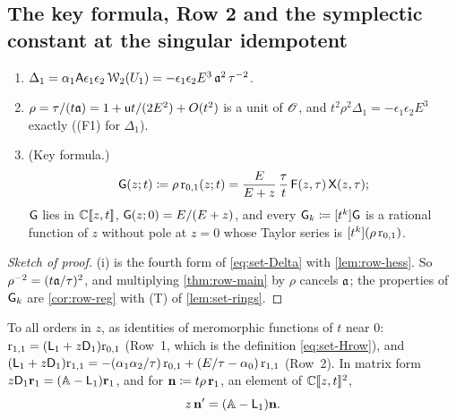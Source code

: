 \subsection{The key formula, Row 2 and the symplectic constant at the singular idempotent}
\label{sec:lea-qde}

\begin{prop}
\label{prop:lea-key}
\leavevmode
\begin{enumerate}
\item $\Delta_1=\alpha_1\mathsf{A}\epsilon_1\epsilon_2\,\mathcal{W}_2(U_1)=-\epsilon_1\epsilon_2E^3\,\mathfrak{a}^2\,\tau^{-2}$.
\item $\rho=\tau/(t\mathfrak{a})=1+\mathsf{u} t/(2E^2)+O(t^2)$ is a unit of $\mathscr{O}$, and $t^2\rho^2\Delta_1=-\epsilon_1\epsilon_2E^3$ exactly ((F1) for $\Delta_1$).
\item (Key formula.)
\begin{equation}
\label{eq:lea-key}
\mathsf{G}(z;t)\coloneqq\rho\,\mathrm{r}_{0,1}(z;t)=\frac{E}{E+z}\,\frac{\tau}{t}\,\mathsf{F}(z,\tau)\,\mathsf{X}(z,\tau);
\end{equation}
$\mathsf{G}$ lies in $\mathbb{C}[\![ z,t ]\!]$, $\mathsf{G}(z;0)=E/(E+z)$, and every $\mathsf{G}_k\coloneqq[t^k]\mathsf{G}$ is a rational function of $z$ without pole at $z=0$ whose Taylor series is $[t^k](\rho\,\mathrm{r}_{0,1})$.
\end{enumerate}
\end{prop}

\begin{proof}[Sketch of proof]
(i) is the fourth form of \eqref{eq:set-Delta} with \cref{lem:row-hess}. So $\rho^{-2}=(t\mathfrak{a}/\tau)^2$, and multiplying \cref{thm:row-main} by $\rho$ cancels $\mathfrak{a}$; the properties of $\mathsf{G}_k$ are \cref{cor:row-reg} with (T) of \cref{lem:set-rings}.
\end{proof}

\begin{prop}
\label{prop:lea-row2}
To all orders in $z$, as identities of meromorphic functions of $t$ near $0$: $\mathrm{r}_{1,1}=(\mathsf{L}_1+z\mathsf{D}_1)\mathrm{r}_{0,1}$ (Row~1, which is the definition \eqref{eq:set-Hrow}), and $(\mathsf{L}_1+z\mathsf{D}_1)\mathrm{r}_{1,1}=-(\alpha_1\alpha_2/\tau)\,\mathrm{r}_{0,1}+(E/\tau-\alpha_0)\,\mathrm{r}_{1,1}$ (Row~2). In matrix form $z\mathsf{D}_1\mathbf{r}_1=(\mathbb{A}-\mathsf{L}_1)\mathbf{r}_1$, and for $\mathbf{n}\coloneqq t\rho\,\mathbf{r}_1$, an element of $\mathbb{C}[\![ z,t ]\!]^2$,
\begin{equation}
\label{eq:lea-qde}
z\,\mathbf{n}'=(\mathbb{A}-\mathsf{L}_1)\mathbf{n} .
\end{equation}
\end{prop}

